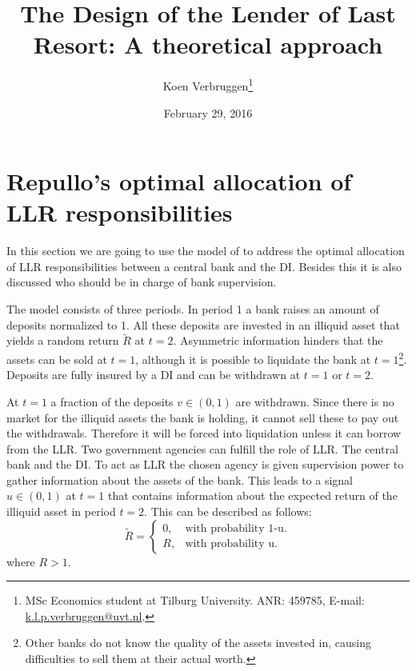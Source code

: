 \documentclass[twoside, 12pt]{article}
\title{\vspace{-15mm} The Design of the Lender of Last Resort: A theoretical approach}
\author{Koen Verbruggen\footnote{MSc Economics student at Tilburg University. ANR: 459785, E-mail: \href{mailto:k.l.p.verbruggen@tilburguniversity.edu}{k.l.p.verbruggen@uvt.nl}.} }
\numberwithin{equation}{section}
\renewcommand{\headrulewidth}{0pt}
\begin{document}
\date{February 29, 2016}
\maketitle

\fancypagestyle{firststyle}{\fancyhf{}\fancyfoot{}\fancyhead{}\renewcommand{\headrulewidth}{0pt}}
\thispagestyle{firststyle}

\section{Repullo's optimal allocation of LLR responsibilities}\label{sec:modelrepullo}
In this section we are going to use the model of \cite{repullo2000} to address the optimal allocation of LLR responsibilities between a central bank and the DI. Besides this it is also discussed who should be in charge of bank supervision.

The model consists of three periods. In period 1 a bank raises an amount of deposits normalized to 1. All these deposits are invested in an illiquid asset that yields a random return $\widetilde{R}$ at $t=2$. Asymmetric information hinders that the assets can be sold at $t=1$, although it is possible to liquidate the bank at $t=1$\footnote{Other banks do not know the quality of the assets invested in, causing difficulties to sell them at their actual worth.}. Deposits are fully insured by a DI and can be withdrawn at $t=1$ or $t=2$.

At $t=1$ a fraction of the deposits $v \in (0,1)$ are withdrawn. Since there is no market for the illiquid assets the bank is holding, it cannot sell these to pay out the withdrawals. Therefore it will be forced into liquidation unless it can borrow from the LLR. Two government agencies can fulfill the role of LLR. The central bank and the DI. To act as LLR the chosen agency is given supervision power to gather information about the assets of the bank. This leads to a signal $u \in (0,1)$ at $t=1$ that contains information about the expected return of the illiquid asset in period $t=2$. This can be described as follows:
\begin{equation}\label{eq:repulloreturn}
  \widetilde{R}=\begin{cases}
    0, & \text{with probability 1-u}.\\
    R, & \text{with probability u}.
  \end{cases}
\end{equation}
where $R>1$.
\end{document}
